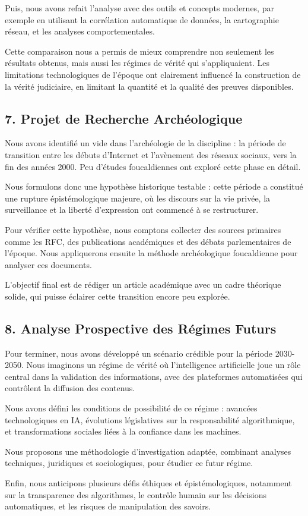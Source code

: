 \documentclass[12pt,a4paper]{report}
\begin{document}
Puis, nous avons refait l’analyse avec des outils et concepts modernes, par exemple en utilisant la corrélation automatique de données, la cartographie réseau, et les analyses comportementales.

Cette comparaison nous a permis de mieux comprendre non seulement les résultats obtenus, mais aussi les régimes de vérité qui s’appliquaient. Les limitations technologiques de l’époque ont clairement influencé la construction de la vérité judiciaire, en limitant la quantité et la qualité des preuves disponibles.

\subsection*{7. Projet de Recherche Archéologique}

Nous avons identifié un vide dans l’archéologie de la discipline : la période de transition entre les débuts d’Internet et l’avènement des réseaux sociaux, vers la fin des années 2000. Peu d’études foucaldiennes ont exploré cette phase en détail.

Nous formulons donc une hypothèse historique testable : cette période a constitué une rupture épistémologique majeure, où les discours sur la vie privée, la surveillance et la liberté d’expression ont commencé à se restructurer.

Pour vérifier cette hypothèse, nous comptons collecter des sources primaires comme les RFC, des publications académiques et des débats parlementaires de l’époque. Nous appliquerons ensuite la méthode archéologique foucaldienne pour analyser ces documents.

L’objectif final est de rédiger un article académique avec un cadre théorique solide, qui puisse éclairer cette transition encore peu explorée.

\subsection*{8. Analyse Prospective des Régimes Futurs}

Pour terminer, nous avons développé un scénario crédible pour la période 2030-2050. Nous imaginons un régime de vérité où l’intelligence artificielle joue un rôle central dans la validation des informations, avec des plateformes automatisées qui contrôlent la diffusion des contenus.

Nous avons défini les conditions de possibilité de ce régime : avancées technologiques en IA, évolutions législatives sur la responsabilité algorithmique, et transformations sociales liées à la confiance dans les machines.

Nous proposons une méthodologie d’investigation adaptée, combinant analyses techniques, juridiques et sociologiques, pour étudier ce futur régime.

Enfin, nous anticipons plusieurs défis éthiques et épistémologiques, notamment sur la transparence des algorithmes, le contrôle humain sur les décisions automatiques, et les risques de manipulation des savoirs.
\end{document}
